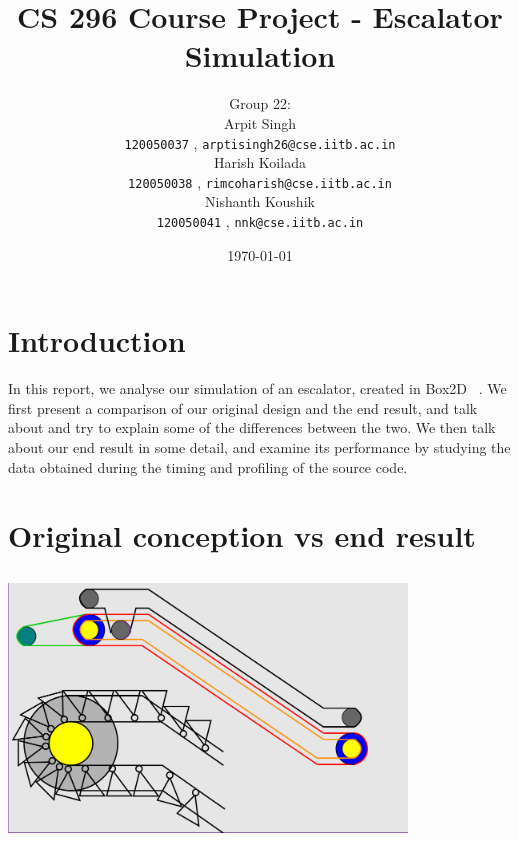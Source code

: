 \documentclass[11pt]{article}
\begin{document}


\title{CS 296 Course Project - Escalator Simulation}

\author{
	Group 22:\\
	Arpit Singh\\ 
	\texttt{120050037} , \texttt{arptisingh26@cse.iitb.ac.in} \\
	Harish Koilada\\ 
	\texttt{120050038} , \texttt{rimcoharish@cse.iitb.ac.in} \\
	Nishanth Koushik\\ 
	\texttt{120050041} , \texttt{nnk@cse.iitb.ac.in}
}

\date{\today}

\maketitle

\section{Introduction}

	In this report, we analyse our simulation of an escalator, created in Box2D
	~\cite{box2d}. 
	We first present a comparison of our original design and the end result, and talk about and try to explain some of the differences between the two. We then talk about our end result in some detail, and examine its performance by studying the data obtained during the timing and profiling of the source code.

\section{Original conception vs end result}

	\includegraphics[width=300pt, height=200pt]{../plots/design.png}\\\\
	
\end{document}
